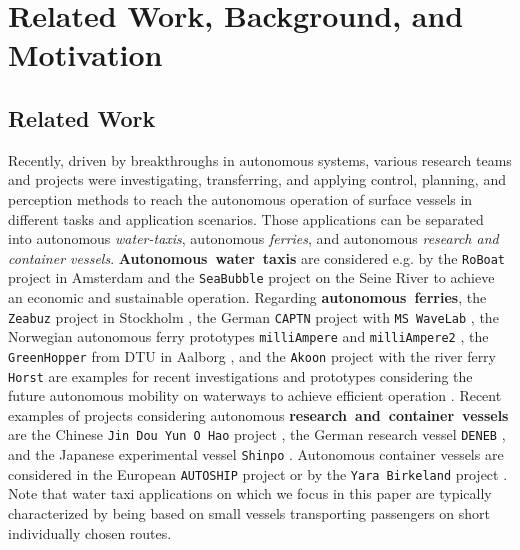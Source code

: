 \section{Related Work, Background, and Motivation}
\label{sec_background}
\subsection{Related Work}
Recently, driven by breakthroughs in autonomous systems, various research teams and projects were investigating, transferring, and applying control, planning, and perception methods to reach the autonomous operation of surface vessels in different tasks and application scenarios. Those applications can be separated into autonomous \textit{water-taxis},  \mbox{autonomous} \textit{ferries}, and autonomous \textit{research and container vessels}.  \mbox{\textbf{Autonomous water taxis}} are considered e.g. by the \texttt{RoBoat} project in Amsterdam \citep{Wang.2023} and the \texttt{SeaBubble} project on the Seine River \citep{Seabubble.2021} to achieve an economic \citep{Gu.2021} and sustainable \citep{Saldarini.2023} operation. 
Regarding  \mbox{\textbf{autonomous ferries}}, the \texttt{Zeabuz} project in Stockholm \citep{Hjelmeland.2022}, the German \texttt{CAPTN} project with \texttt{MS WaveLab} \citep{AlFalouji.2023}, the Norwegian autonomous ferry prototypes \texttt{milliAmpere} \citep{Brekke.2022} and \texttt{milliAmpere2} \citep{Alsos.2024}, the \texttt{GreenHopper} from DTU in Aalborg \citep{Enevoldsen.2022}, and the \texttt{Akoon} project with the river ferry \texttt{Horst} \citep{Koschorrek.2022} are examples for recent investigations and prototypes considering the future autonomous mobility on waterways \citep{Tannum.2019} to achieve efficient operation \citep{Reddy.2019}. 
Recent examples of projects considering autonomous  \mbox{\textbf{research and container vessels}} are the Chinese \texttt{Jin Dou Yun O Hao} project \citep{Chen.2023}, the German research vessel \texttt{DENEB} \citep{Rethfeldt.2021}, and the Japanese experimental vessel \texttt{Shinpo} \citep{Sawada.2021}. Autonomous container vessels \citep{Munim.2022} are considered in the European \texttt{AUTOSHIP} project \citep{Theotokatos.2023} or by the \texttt{Yara Birkeland} project \citep{Akbar.2021}. 
Note that water taxi applications on which we focus in this paper are typically characterized by being based on small vessels transporting passengers on short individually chosen routes.  


